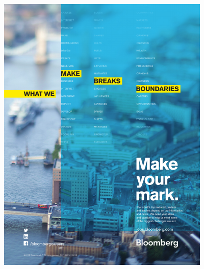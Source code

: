 \clearpage
\thispagestyle{empty}
\begin{center}
  \vfill
  \includegraphics[width=4in]{content/ads/platinum/Bloomberg.pdf}
  \vfill
\end{center}

